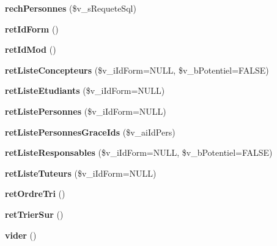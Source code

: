\begin{CompactItemize}
\item 
\textbf{rechPersonnes} (\$v\_\-sRequeteSql)\label{class_c_personnes_ce939e5d45748beaae811b9a2beec711}

\item 
\textbf{retIdForm} ()\label{class_c_personnes_eaf7de81390ebf4ec8a2dccc4df598f5}

\item 
\textbf{retIdMod} ()\label{class_c_personnes_8a17813a2894ed9a08672d4ad0c606b2}

\item 
\textbf{retListeConcepteurs} (\$v\_\-iIdForm=NULL, \$v\_\-bPotentiel=FALSE)\label{class_c_personnes_05058fde1a25a8d7ef58b4298d3b5084}

\item 
\textbf{retListeEtudiants} (\$v\_\-iIdForm=NULL)\label{class_c_personnes_ccd03de5e31c1cca7548b3960cdb7979}

\item 
\textbf{retListePersonnes} (\$v\_\-iIdForm=NULL)\label{class_c_personnes_a147a854d0fb74e32e6469b7ab7b58cd}

\item 
\textbf{retListePersonnesGraceIds} (\$v\_\-aiIdPers)\label{class_c_personnes_750250c16d20960f0800f3f2b5749659}

\item 
\textbf{retListeResponsables} (\$v\_\-iIdForm=NULL, \$v\_\-bPotentiel=FALSE)\label{class_c_personnes_4d41a318e3ecae8900f6b95584c039a8}

\item 
\textbf{retListeTuteurs} (\$v\_\-iIdForm=NULL)\label{class_c_personnes_3ebda4b12073c638f99c476cefe4e393}

\item 
\textbf{retOrdreTri} ()\label{class_c_personnes_4fb4d30016144de6273c785931f41989}

\item 
\textbf{retTrierSur} ()\label{class_c_personnes_e026c62aacf78b8ce69d9759a6f70f34}

\item 
\textbf{vider} ()\label{class_c_personnes_5ed0b86884fd359a1863650d59f6c122}

\end{CompactItemize}
